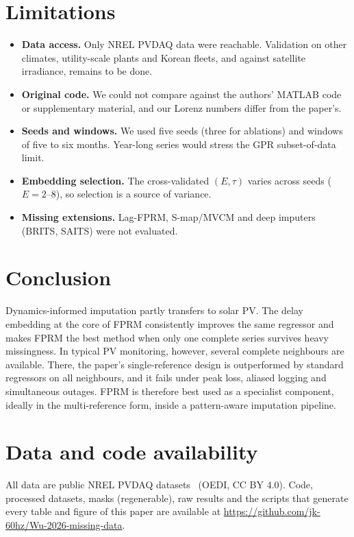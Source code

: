 \documentclass[11pt,a4paper]{article}
\begin{document}
\section{Limitations}\label{sec:limitations}
\begin{itemize}
  \item \textbf{Data access.} Only NREL PVDAQ data were reachable. Validation on other climates, utility-scale plants and Korean fleets, and against satellite irradiance, remains to be done.
  \item \textbf{Original code.} We could not compare against the authors' MATLAB code or supplementary material, and our Lorenz numbers differ from the paper's.
  \item \textbf{Seeds and windows.} We used five seeds (three for ablations) and windows of five to six months. Year-long series would stress the GPR subset-of-data limit.
  \item \textbf{Embedding selection.} The cross-validated $(E,\tau)$ varies across seeds ($E=2$--8), so selection is a source of variance.
  \item \textbf{Missing extensions.} Lag-FPRM, S-map/MVCM and deep imputers (BRITS, SAITS) were not evaluated.
\end{itemize}

\section{Conclusion}
Dynamics-informed imputation partly transfers to solar PV.
The delay embedding at the core of FPRM consistently improves the same regressor and makes FPRM the best method when only one complete series survives heavy missingness.
In typical PV monitoring, however, several complete neighbours are available.
There, the paper's single-reference design is outperformed by standard regressors on all neighbours, and it fails under peak loss, aliased logging and simultaneous outages.
FPRM is therefore best used as a specialist component, ideally in the multi-reference form, inside a pattern-aware imputation pipeline.

\section*{Data and code availability}
All data are public NREL PVDAQ datasets~\cite{pvdaq} (OEDI, CC BY 4.0).
Code, processed datasets, masks (regenerable), raw results and the scripts that generate every table and figure of this paper are available at \url{https://github.com/jk-60hz/Wu-2026-missing-data}.
\end{document}
